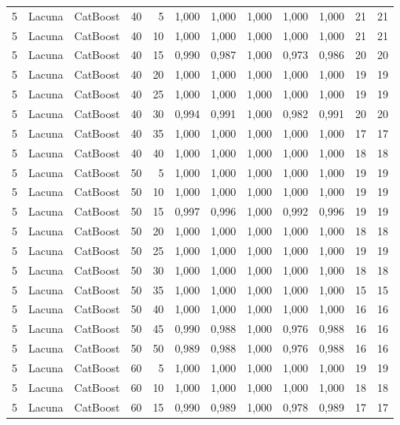 \begin{longtable}{ccclrrrrrrrr}
5 & Lacuna & CatBoost & 40 & 5 & 1,000 & 1,000 & 1,000 & 1,000 & 1,000 & 21 & 21 \\
5 & Lacuna & CatBoost & 40 & 10 & 1,000 & 1,000 & 1,000 & 1,000 & 1,000 & 21 & 21 \\
5 & Lacuna & CatBoost & 40 & 15 & 0,990 & 0,987 & 1,000 & 0,973 & 0,986 & 20 & 20 \\
5 & Lacuna & CatBoost & 40 & 20 & 1,000 & 1,000 & 1,000 & 1,000 & 1,000 & 19 & 19 \\
5 & Lacuna & CatBoost & 40 & 25 & 1,000 & 1,000 & 1,000 & 1,000 & 1,000 & 19 & 19 \\
5 & Lacuna & CatBoost & 40 & 30 & 0,994 & 0,991 & 1,000 & 0,982 & 0,991 & 20 & 20 \\
5 & Lacuna & CatBoost & 40 & 35 & 1,000 & 1,000 & 1,000 & 1,000 & 1,000 & 17 & 17 \\
5 & Lacuna & CatBoost & 40 & 40 & 1,000 & 1,000 & 1,000 & 1,000 & 1,000 & 18 & 18 \\
5 & Lacuna & CatBoost & 50 & 5 & 1,000 & 1,000 & 1,000 & 1,000 & 1,000 & 19 & 19 \\
5 & Lacuna & CatBoost & 50 & 10 & 1,000 & 1,000 & 1,000 & 1,000 & 1,000 & 19 & 19 \\
5 & Lacuna & CatBoost & 50 & 15 & 0,997 & 0,996 & 1,000 & 0,992 & 0,996 & 19 & 19 \\
5 & Lacuna & CatBoost & 50 & 20 & 1,000 & 1,000 & 1,000 & 1,000 & 1,000 & 18 & 18 \\
5 & Lacuna & CatBoost & 50 & 25 & 1,000 & 1,000 & 1,000 & 1,000 & 1,000 & 19 & 19 \\
5 & Lacuna & CatBoost & 50 & 30 & 1,000 & 1,000 & 1,000 & 1,000 & 1,000 & 18 & 18 \\
5 & Lacuna & CatBoost & 50 & 35 & 1,000 & 1,000 & 1,000 & 1,000 & 1,000 & 15 & 15 \\
5 & Lacuna & CatBoost & 50 & 40 & 1,000 & 1,000 & 1,000 & 1,000 & 1,000 & 16 & 16 \\
5 & Lacuna & CatBoost & 50 & 45 & 0,990 & 0,988 & 1,000 & 0,976 & 0,988 & 16 & 16 \\
5 & Lacuna & CatBoost & 50 & 50 & 0,989 & 0,988 & 1,000 & 0,976 & 0,988 & 16 & 16 \\
5 & Lacuna & CatBoost & 60 & 5 & 1,000 & 1,000 & 1,000 & 1,000 & 1,000 & 19 & 19 \\
5 & Lacuna & CatBoost & 60 & 10 & 1,000 & 1,000 & 1,000 & 1,000 & 1,000 & 18 & 18 \\
5 & Lacuna & CatBoost & 60 & 15 & 0,990 & 0,989 & 1,000 & 0,978 & 0,989 & 17 & 17 \\

\end{longtable}
